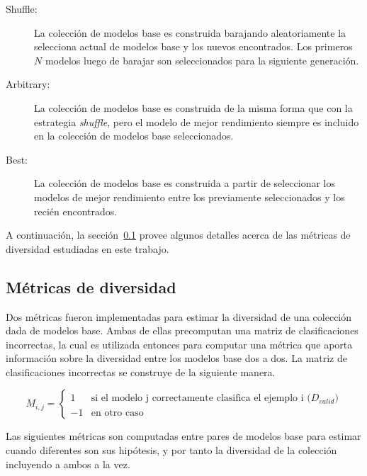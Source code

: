 \begin{description}
    \item[Shuffle:]
    La colección de modelos base es construida barajando aleatoriamente la selecciona actual de modelos base y los nuevos encontrados.
    Los primeros $N$ modelos luego de barajar son seleccionados para la siguiente generación.
    \item[Arbitrary:]
    La colección de modelos base es construida de la misma forma que con la estrategia \textit{shuffle}, pero el modelo de mejor rendimiento siempre es incluido en la colección de modelos base seleccionados.
    \item[Best:]
    La colección de modelos base es construida a partir de seleccionar los modelos de mejor rendimiento entre los previamente seleccionados y los recién encontrados.
\end{description}

A continuación, la sección~\ref{section:diversity-meassures} provee algunos detalles acerca de las métricas de diversidad estudiadas en este trabajo.

\subsection{Métricas de diversidad}\label{section:diversity-meassures}

Dos métricas fueron implementadas para estimar la diversidad de una colección dada de modelos base.
Ambas de ellas precomputan una matriz de clasificaciones incorrectas, la cual es utilizada entonces para computar una métrica que aporta información sobre la diversidad entre los modelos base dos a dos.
La matriz de clasificaciones incorrectas se construye de la siguiente manera.

\begin{equation}
    M_{i,j} =
    \begin{cases}
        1 & \text{si el modelo j correctamente clasifica el ejemplo i ($D_{valid}$)} \\
        -1 & \text{en otro caso}
    \end{cases}
\end{equation}

Las siguientes métricas son computadas entre pares de modelos base para estimar cuando diferentes son sus hipótesis, y por tanto la diversidad de la colección incluyendo a ambos a la vez.

